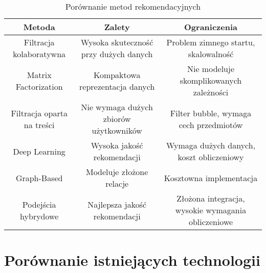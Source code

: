 \documentclass[a4paper]{LTJournalArticle}
\begin{document}
\begin{table}[h]
	\centering
	\begin{tabular}{|c|c|c|}
		\hline
		\textbf{Metoda} & \textbf{Zalety} & \textbf{Ograniczenia} \\
		\hline
		Filtracja kolaboratywna & Wysoka skuteczność przy dużych danych & Problem zimnego startu, skalowalność \\
		\hline
		Matrix Factorization & Kompaktowa reprezentacja danych & Nie modeluje skomplikowanych zależności \\
		\hline
		Filtracja oparta na treści & Nie wymaga dużych zbiorów użytkowników & Filter bubble, wymaga cech przedmiotów \\
		\hline
		Deep Learning & Wysoka jakość rekomendacji & Wymaga dużych danych, koszt obliczeniowy \\
		\hline
		Graph-Based & Modeluje złożone relacje & Kosztowna implementacja \\
		\hline
		Podejścia hybrydowe & Najlepsza jakość rekomendacji & Złożona integracja, wysokie wymagania obliczeniowe \\
		\hline
	\end{tabular}
	\caption{Porównanie metod rekomendacyjnych}
	\label{tab:comparison}
\end{table}

\section{Porównanie istniejących technologii}
\end{document}

